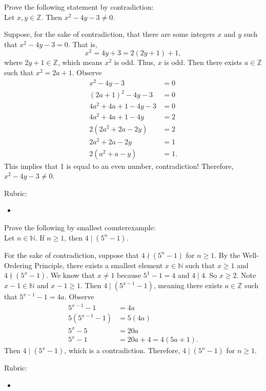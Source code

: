 \documentclass{article}
\newcommand{\Z}{\mathbb{Z}}
\theoremstyle{definition}
\begin{document}
\begin{question}{5}
    Prove the following statement by contradiction:\\
    Let $x, y\in \Z$. Then $x^2-4y-3\neq 0$.
\end{question}
\begin{solution}
Suppose, for the sake of contradiction, that there are some integers $x$ and $y$ such that $x^2 - 4y - 3 = 0$. That is,
	\[ x^2 = 4y+3 = 2(2y+1)+1, \]
where $2y+1\in \Z$, which means $x^2$ is odd. Thus, $x$ is odd. Then there exists $a\in \Z$ such that $x^2=2a+1$. Observe 
\begin{align*}
x^2 - 4y - 3 & = 0\\
(2a+1)^2 -4y -3 &= 0\\
4a^2+4a+1 -4y -3 & = 0\\
4a^2+4a+1 -4y & = 2\\
2(2a^2+2a - 2y) & = 2\\
2a^2+2a - 2y & = 1\\
2(a^2+a - y) & = 1.
\end{align*}
This implies that 1 is equal to an even number, contradiction! Therefore, $x^2-4y-3\neq 0$.

{\color{red} Rubric:
\begin{itemize}
\item 
\end{itemize}}
\end{solution}

\begin{question}{6}
    Prove the following by smallest counterexample:\\
    Let $n\in \mathbb{N}$. If $n\geq 1$, then $4 \mid (5^n-1)$.
\end{question}
\begin{solution}
      For the sake of contradiction, suppose that $4 \nmid (5^n-1)$ for $n\geq 1$. By the Well-Ordering Principle, there exists a smallest element $x\in \mathbb{N}$ such that $x\geq 1$ and $4 \nmid (5^x-1)$. We know that $x\neq 1$ because $5^1-1=4$ and $4\mid 4$. So $x\geq 2$. Note $x-1\in \mathbb{N}$ and $x-1\geq 1$. Then $4\mid (5^{x-1}-1)$, meaning there exists $a\in \Z$ such that $5^{x-1}-1 = 4a$. Observe
      \begin{align*}
      5^{x-1}-1 &= 4a\\
      5(5^{x-1}-1) &= 5(4a)\\
      5^x - 5 &= 20a\\
      5^x -1 &= 20a +4 = 4(5a+1).
      \end{align*}
      Then $4\mid (5^x-1)$, which is a contradiction. Therefore, $4 \mid (5^n-1)$ for $n\geq 1$.
{\color{red} Rubric:
\begin{itemize}
\item 
\end{itemize}}
\end{solution}
\end{document}
